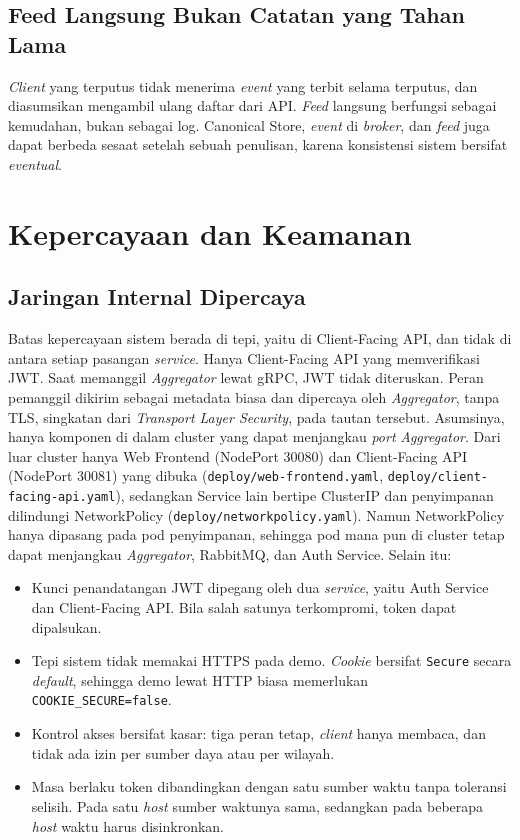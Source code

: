 \subsection{Feed Langsung Bukan Catatan yang Tahan Lama}

\textit{Client} yang terputus tidak menerima \textit{event} yang terbit selama terputus, dan diasumsikan mengambil ulang daftar dari API. \textit{Feed} langsung berfungsi sebagai kemudahan, bukan sebagai log. Canonical Store, \textit{event} di \textit{broker}, dan \textit{feed} juga dapat berbeda sesaat setelah sebuah penulisan, karena konsistensi sistem bersifat \textit{eventual}.

\section{Kepercayaan dan Keamanan}

\subsection{Jaringan Internal Dipercaya}

Batas kepercayaan sistem berada di tepi, yaitu di Client-Facing API, dan tidak di antara setiap pasangan \textit{service}. Hanya Client-Facing API yang memverifikasi JWT. Saat memanggil \textit{Aggregator} lewat gRPC, JWT tidak diteruskan. Peran pemanggil dikirim sebagai metadata biasa dan dipercaya oleh \textit{Aggregator}, tanpa TLS, singkatan dari \textit{Transport Layer Security}, pada tautan tersebut. Asumsinya, hanya komponen di dalam cluster yang dapat menjangkau \textit{port} \textit{Aggregator}. Dari luar cluster hanya Web Frontend (NodePort 30080) dan Client-Facing API (NodePort 30081) yang dibuka (\texttt{deploy/web-frontend.yaml}, \texttt{deploy/client-facing-api.yaml}), sedangkan Service lain bertipe ClusterIP dan penyimpanan dilindungi NetworkPolicy (\texttt{deploy/networkpolicy.yaml}). Namun NetworkPolicy hanya dipasang pada pod penyimpanan, sehingga pod mana pun di cluster tetap dapat menjangkau \textit{Aggregator}, RabbitMQ, dan Auth Service. Selain itu:

\begin{itemize}
\item Kunci penandatangan JWT dipegang oleh dua \textit{service}, yaitu Auth Service dan Client-Facing API. Bila salah satunya terkompromi, token dapat dipalsukan.
\item Tepi sistem tidak memakai HTTPS pada demo. \textit{Cookie} bersifat \texttt{Secure} secara \textit{default}, sehingga demo lewat HTTP biasa memerlukan \texttt{COOKIE\_SECURE=false}.
\item Kontrol akses bersifat kasar: tiga peran tetap, \textit{client} hanya membaca, dan tidak ada izin per sumber daya atau per wilayah.
\item Masa berlaku token dibandingkan dengan satu sumber waktu tanpa toleransi selisih. Pada satu \textit{host} sumber waktunya sama, sedangkan pada beberapa \textit{host} waktu harus disinkronkan.
\end{itemize}

